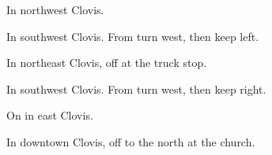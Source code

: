 
\begin{LocationList}

In northwest Clovis.

In southwest Clovis.
From  turn west, then keep left.

In northeast Clovis, off    at the truck stop.

In southwest Clovis.
From  turn west, then keep right.

\Location{\TruckStop \Gas \Rest \Service}
On    in east Clovis.

In downtown Clovis, off   to the north at the church.

\end{LocationList}
